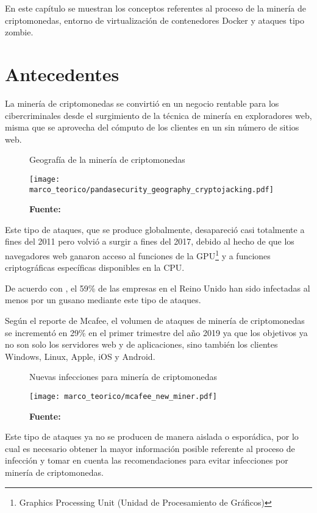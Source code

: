 \documentclass[../main/main.tex]{subfiles}
\begin{document}
\espacio
  En este capítulo se muestran los conceptos referentes al proceso de la minería de criptomonedas, entorno de virtualización de contenedores Docker y ataques tipo zombie.

  \section{Antecedentes}

  La minería de criptomonedas se convirtió en un negocio rentable para los cibercriminales desde el surgimiento de la técnica de minería en exploradores web, misma que se aprovecha del cómputo de los clientes en un sin número de sitios web.

  \begin{figure}[H]
    \centering
    \caption{Geografía de la minería de criptomonedas}
    \texttt{[image: marco\_teorico/pandasecurity\_geography\_cryptojacking.pdf]}
    \caption*{\textbf{Fuente:} \cite{report:pandasecurity_coinhive_mining}}
  \end{figure}

  Este tipo de ataques, que se produce globalmente, desapareció casi totalmente a fines del 2011 pero volvió a surgir a fines del 2017, debido al hecho de que los navegadores web ganaron acceso al funciones de la GPU\footnote{Graphics Processing Unit (Unidad de Procesamiento de Gráficos)} y a funciones criptográficas específicas disponibles en la CPU.

  De acuerdo con \cite[p.~13]{report:pandasecurity_coinhive_mining}, el 59\% de las empresas en el Reino Unido han sido infectadas al menos por un gusano mediante este tipo de ataques.

  Según el reporte \cite[p.~22]{report:mcafee_threats} de Mcafee, el volumen de ataques de minería de criptomonedas se incrementó en 29\% en el primer trimestre del año 2019 ya que los objetivos ya no son solo los servidores web y de aplicaciones, sino también los clientes Windows, Linux, Apple, iOS y Android.

  \begin{figure}[ht]
    \centering
    \caption{Nuevas infecciones para minería de criptomonedas}
    \texttt{[image: marco\_teorico/mcafee\_new\_miner.pdf]}
    \caption*{\textbf{Fuente:} \cite{report:mcafee_threats}}
  \end{figure}

  Este tipo de ataques ya no se producen de manera aislada o esporádica, por lo cual es necesario obtener la mayor información posible referente al proceso de infección y tomar en cuenta las recomendaciones para evitar infecciones por minería de criptomonedas.
\end{document}
